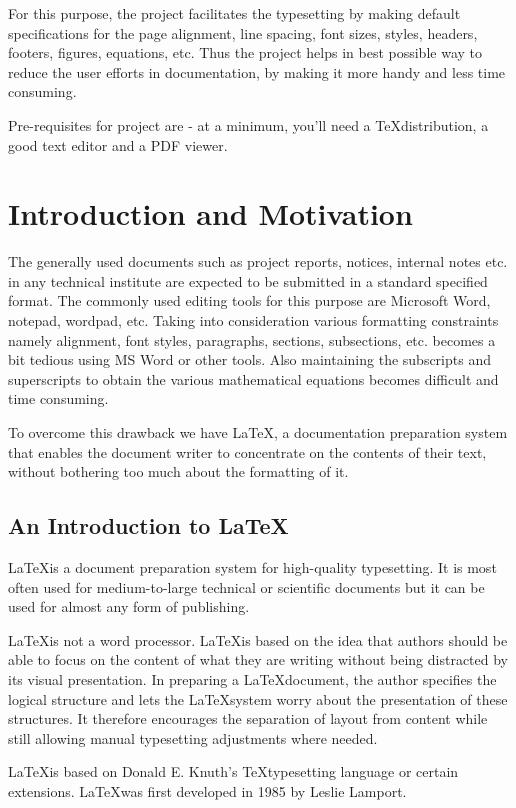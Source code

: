 \documentclass{ProjectReport}
\begin{document}
For this purpose,  the project facilitates the typesetting by making default specifications for the page alignment, line spacing, font sizes, styles, headers, footers, figures, equations, etc.
Thus the project helps in best possible way to reduce the user efforts in documentation, by making it more handy and less time consuming.

Pre-requisites for project are - at a minimum, you'll need a \TeX distribution, a good text editor and a PDF viewer.

\chapter{Introduction and Motivation}
\thispagestyle{empty}
The generally used documents such as project reports, notices, internal notes etc. in any technical institute are expected to be submitted in a standard specified format. The commonly used editing tools for this purpose are Microsoft Word, notepad, wordpad, etc. Taking into consideration various formatting constraints namely alignment, font styles, paragraphs, sections, subsections, etc. becomes a bit tedious using MS Word or other tools. Also maintaining the subscripts and superscripts to obtain the various mathematical equations becomes difficult and time consuming.

To overcome this drawback we have \LaTeX, a documentation preparation system that enables the document writer to concentrate on the contents of their text, without bothering too much about the formatting of it. 

\section{An Introduction to \LaTeX}
\LaTeX is a document preparation system for high-quality typesetting. It is most often used for medium-to-large technical or scientific documents but it can be used for almost any form of publishing.

\LaTeX is not a word processor. \LaTeX is based on the idea that authors should be able to focus on the content of what they are writing without being distracted by its visual presentation. In preparing a \LaTeX document, the author specifies the logical structure and lets the \LaTeX system worry about the presentation of these structures. It therefore encourages the separation of layout from content while still allowing manual typesetting adjustments where needed.

\LaTeX is based on Donald E. Knuth's \TeX typesetting language or certain extensions. \LaTeX was first developed in 1985 by Leslie Lamport.
\end{document}
